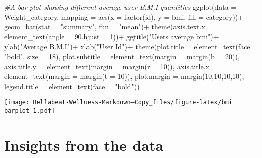 \documentclass[
]{article}
\newenvironment{Shaded}{\begin{snugshade}}{\end{snugshade}}
\newcommand{\AttributeTok}[1]{\textcolor[rgb]{0.77,0.63,0.00}{#1}}
\newcommand{\CommentTok}[1]{\textcolor[rgb]{0.56,0.35,0.01}{\textit{#1}}}
\newcommand{\DecValTok}[1]{\textcolor[rgb]{0.00,0.00,0.81}{#1}}
\newcommand{\FunctionTok}[1]{\textcolor[rgb]{0.00,0.00,0.00}{#1}}
\newcommand{\NormalTok}[1]{#1}
\newcommand{\SpecialCharTok}[1]{\textcolor[rgb]{0.00,0.00,0.00}{#1}}
\newcommand{\StringTok}[1]{\textcolor[rgb]{0.31,0.60,0.02}{#1}}
\begin{document}
\begin{Shaded}
\begin{Highlighting}[]
\CommentTok{\#A bar plot showing different average user B.M.I quantities}
\FunctionTok{ggplot}\NormalTok{(}\AttributeTok{data =}\NormalTok{ Weight\_category, }\AttributeTok{mapping =} \FunctionTok{aes}\NormalTok{(}\AttributeTok{x =} \FunctionTok{factor}\NormalTok{(id), }\AttributeTok{y =}\NormalTok{ bmi,}
                                             \AttributeTok{fill =}\NormalTok{ category))}\SpecialCharTok{+}
  \FunctionTok{geom\_bar}\NormalTok{(}\AttributeTok{stat =} \StringTok{"summary"}\NormalTok{, }\AttributeTok{fun =} \StringTok{"mean"}\NormalTok{)}\SpecialCharTok{+}
  \FunctionTok{theme}\NormalTok{(}\AttributeTok{axis.text.x =} \FunctionTok{element\_text}\NormalTok{(}\AttributeTok{angle =} \DecValTok{90}\NormalTok{,}\AttributeTok{hjust =} \DecValTok{1}\NormalTok{))}\SpecialCharTok{+}
  \FunctionTok{ggtitle}\NormalTok{(}\StringTok{"Users average bmi"}\NormalTok{)}\SpecialCharTok{+}
  \FunctionTok{ylab}\NormalTok{(}\StringTok{"Average B.M.I"}\NormalTok{)}\SpecialCharTok{+}
  \FunctionTok{xlab}\NormalTok{(}\StringTok{"User Id"}\NormalTok{)}\SpecialCharTok{+}
  \FunctionTok{theme}\NormalTok{(}\AttributeTok{plot.title =} \FunctionTok{element\_text}\NormalTok{(}\AttributeTok{face =} \StringTok{"bold"}\NormalTok{, }\AttributeTok{size =} \DecValTok{18}\NormalTok{),}
        \AttributeTok{plot.subtitle =} \FunctionTok{element\_text}\NormalTok{(}\AttributeTok{margin =} \FunctionTok{margin}\NormalTok{(}\AttributeTok{b =} \DecValTok{20}\NormalTok{)),}
        \AttributeTok{axis.title.y =} \FunctionTok{element\_text}\NormalTok{(}\AttributeTok{margin =} \FunctionTok{margin}\NormalTok{(}\AttributeTok{r =} \DecValTok{10}\NormalTok{)),}
        \AttributeTok{axis.title.x =} \FunctionTok{element\_text}\NormalTok{(}\AttributeTok{margin =} \FunctionTok{margin}\NormalTok{(}\AttributeTok{t =} \DecValTok{10}\NormalTok{)),}
        \AttributeTok{plot.margin =} \FunctionTok{margin}\NormalTok{(}\DecValTok{10}\NormalTok{,}\DecValTok{10}\NormalTok{,}\DecValTok{10}\NormalTok{,}\DecValTok{10}\NormalTok{),}
        \AttributeTok{legend.title =} \FunctionTok{element\_text}\NormalTok{(}\AttributeTok{face =} \StringTok{"bold"}\NormalTok{))}
\end{Highlighting}
\end{Shaded}

\texttt{[image: Bellabeat-Wellness-Markdown---Copy\_files/figure-latex/bmi barplot-1.pdf]}

\hypertarget{insights-from-the-data}{%
\section{Insights from the data}\label{insights-from-the-data}}
\end{document}
